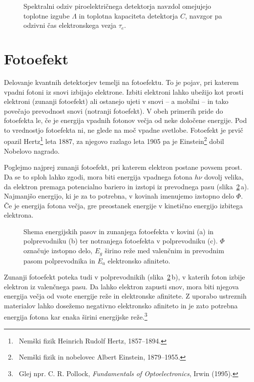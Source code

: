 \begin{figure}[ht]
\centering
\def\svgwidth{100truemm} 

\caption{Spektralni odziv piroelektričnega detektorja navzdol omejujejo toplotne izgube 
$\Lambda$ in toplotna kapaciteta detektorja $C$, navzgor pa odzivni čas elektronskega vezja $\tau_e$.}
\label{fig:Piro}
\end{figure}

\section{Fotoefekt}
Delovanje kvantnih detektorjev temelji na fotoefektu. 
To je pojav, pri katerem vpadni
fotoni iz snovi izbijajo elektrone. Izbiti elektroni lahko ubežijo kot prosti elektroni
(zunanji fotoefekt)
ali ostanejo ujeti v snovi -- a mobilni -- in tako povečajo 
prevodnost snovi (notranji fotoefekt). 
V obeh primerih pride do fotoefekta le, 
če je energija vpadnih fotonov večja od neke določene energije.
Pod to vrednostjo fotoefekta ni, ne glede na moč vpadne svetlobe.
Fotoefekt je prvič opazil Hertz\footnote{~Nemški fizik Heinrich Rudolf Hertz, 1857--1894.} 
leta 1887, za njegovo razlago leta
1905 pa je Einstein\footnote{~Nemški fizik in nobelovec Albert Einstein, 1879--1955.} 
dobil Nobelovo nagrado. 

Poglejmo najprej zunanji fotoefekt, pri katerem elektron postane povsem prost. 
Da se to sploh lahko zgodi, mora biti energija vpadnega fotona $h \nu$ dovolj velika, da 
elektron premaga potencialno bariero in izstopi iz prevodnega pasu (slika~\ref{fig:Nivoji}\,a). 
Najmanjšo energijo, ki je za to potrebna, v kovinah imenujemo izstopno delo $\Phi$. 
Če je energija fotona večja, gre preostanek energije v kinetično energijo izbitega
elektrona.

\begin{figure}[ht]
\centering
\def\svgwidth{140truemm} 

\caption{Shema energijskih pasov in zunanjega fotoefekta v kovini (a) in polprevodniku (b) ter
notranjega fotoefekta v polprevodniku (c). $\Phi$ označuje izstopno delo, $E_g$ širino reže 
med valenčnim in prevodnim pasom polprevodnika in $E_a$ elektronsko afiniteto. }
\label{fig:Nivoji}
\end{figure}

Zunanji fotoefekt poteka tudi v polprevodnikih (slika~\ref{fig:Nivoji}\,b),
v katerih foton izbije elektron iz valenčnega pasu. Da lahko elektron zapusti snov,
mora biti njegova energija večja od vsote energije reže in elektronske afinitete.
Z uporabo ustreznih materialov lahko dosežemo negativno elektronsko afiniteto
in je zato potrebna energija fotona kar enaka širini energijske 
reže.\footnote{~Glej npr. C. R. Pollock, {\it Fundamentals of Optoelectronics}, Irwin (1995).}

